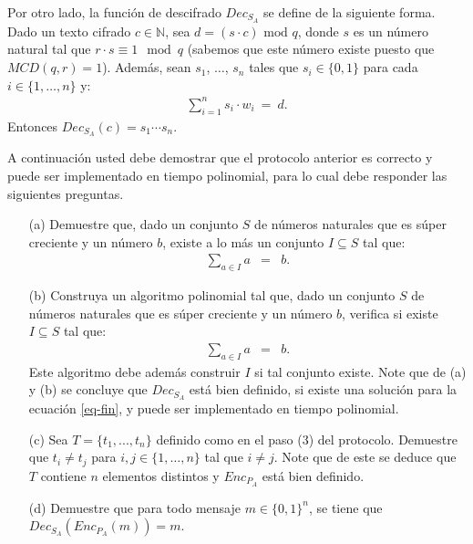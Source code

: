 Por otro lado, la función de descifrado $\textit{Dec}_{S_A}$ se define de la siguiente forma. Dado un texto cifrado $c \in \mathbb{N}$, sea $d = (s \cdot c) \text{ mod } q$, donde $s$ es un número natural tal que $r \cdot s \equiv 1 \mod q$ (sabemos que este número existe puesto que $\textit{MCD}(q,r) = 1$). Además, sean $s_1$, $\ldots$, $s_n$ tales que $s_i \in \{0,1\}$ para cada $i \in \{1, \ldots, n\}$ y:
\begin{align}
  \sum_{i=1}^n s_i \cdot w_i \ = \ d. \tag{\dag} \label{eq-fin}
\end{align}
Entonces $\textit{Dec}_{S_A}(c) = s_1 \cdots s_n$.

A continuación usted debe demostrar que el protocolo anterior es correcto y puede ser implementado en tiempo polinomial, para lo cual debe responder las siguientes preguntas.
\begin{itemize}
\item[(a)] Demuestre que, dado un conjunto $S$ de números naturales que es súper creciente y un número $b$, existe a lo más un conjunto $I \subseteq S$ tal que:
  \begin{eqnarray*}
    \sum_{a \in I} a &=& b.
  \end{eqnarray*}

\item[(b)] Construya un algoritmo polinomial tal que, dado un conjunto $S$ de números naturales que es súper creciente y un número $b$, verifica si existe $I \subseteq S$ tal que:
  \begin{eqnarray*}
    \sum_{a \in I} a &=& b.
  \end{eqnarray*}
  Este algoritmo debe además construir $I$ si tal conjunto existe. Note que de (a) y (b) se concluye que $\textit{Dec}_{S_A}$ está bien definido, si existe una solución para la ecuación \eqref{eq-fin}, y puede ser implementado en tiempo polinomial.

\item[(c)] Sea $T = \{t_1, ..., t_n\}$ definido como en el paso (3) del protocolo. Demuestre que $t_i \neq t_j$ para $i,j \in \{1, \ldots, n\}$ tal que $i \neq j$. Note que de este se deduce que $T$ contiene $n$ elementos distintos y $\textit{Enc}_{P_A}$ está bien definido.

\item[(d)] Demuestre que para todo mensaje $m \in \{0,1\}^n$, se tiene que $\textit{Dec}_{S_A}(\textit{Enc}_{P_A}(m)) = m$.
\end{itemize}


\medskip

